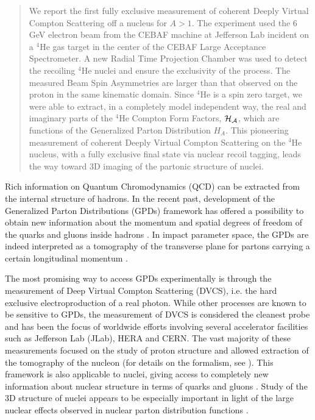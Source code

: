 \documentclass[twocolumn,nofootinbib,showpacs,prl,superscriptaddress,secnumarabic,amssymb,nobibnotes,aps,floatfix]{revtex4}
\begin{document}
%
\date{\today}
\begin{abstract}
We report the first fully exclusive measurement of coherent Deeply Virtual Compton 
Scattering off a nucleus for $A>1$. The experiment used the 6 GeV 
electron beam from the CEBAF machine at Jefferson Lab incident on a $^4$He gas 
target in the center of the CEBAF Large Acceptance Spectrometer. A new 
Radial Time Projection Chamber was used to detect the recoiling $^4$He
nuclei and ensure the exclusivity of the process. The measured Beam Spin 
Asymmetries are larger than that observed on the proton in 
the same kinematic domain. Since $^4$He is a spin zero target, we were able to 
extract, in a completely model independent way, the real and imaginary parts of the $^4$He Compton Form Factors, $\cal H_A$, which are functions of the Generalized Parton Distribution $H_A$. 
This pioneering measurement of coherent Deeply Virtual Compton Scattering on the $^4$He nucleus, with a fully exclusive final state via nuclear recoil tagging, leads the way toward 3D imaging of the partonic structure of nuclei.
\end{abstract}

\maketitle 

Rich information on Quantum Chromodynamics (QCD) can be extracted from the internal structure 
of hadrons. In the recent past, development of the Generalized Parton 
Distributions (GPDs) framework has offered a possibility to obtain new 
information about the momentum and spatial degrees of freedom of the quarks and 
gluons inside hadrons 
\cite{Mueller:1998fv,Ji:1996ek,Ji:1996nm,Radyushkin:1996nd,Radyushkin:1997ki}.
In impact parameter space, the GPDs are indeed interpreted as a tomography of the 
transverse plane for partons carrying a certain longitudinal momentum 
\cite{Burkardt:2000za,Diehl:2002he,Belitsky:2002ep,Burkardt:2005hp}. 

The most promising way to access GPDs experimentally is through the measurement 
of Deep Virtual Compton Scattering (DVCS), i.e.  the hard exclusive 
electroproduction of a real photon.  While other processes are known to be 
sensitive to GPDs, the measurement of DVCS is considered the cleanest probe and 
has been the focus of worldwide efforts 
\cite{Stepanyan:2001sm,Airapetian,Chekanov:2003ya,Aktas:2005ty,Chen:2006na,Munoz 
Camacho:2006hx,Girod:2007aa,Mazouz:2007aa,Gavalian:2009,Seder:2015,Pisano:2015,Jo:2015ema} 
involving several accelerator facilities such as Jefferson Lab (JLab), HERA and  
CERN.  The vast majority of these measurements focused on the study of proton 
structure and allowed extraction of the tomography of the nucleon (for details 
on the formalism, see 
\cite{Goeke:2001tz,Diehl:2003ny,Ji:2004gf,Belitsky:2005qn,Boffi:2007yc,Guidal:2013rya}).
This framework is also applicable to nuclei, giving access to completely new 
information about nuclear structure in terms of quarks and 
gluons \cite{Dupre:2015jha}.
Study of the 3D structure of nuclei appears to be especially important
in light of the large nuclear effects observed in nuclear parton distribution 
functions \cite{Geesaman:1995yd,Norton:2003cb,Hen:2016kwk}.
\end{document}
